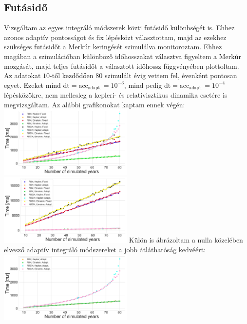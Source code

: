 \begin{multicols}{2}
\section{Futásidő} \label{sec:6}
Vizsgáltam az egyes integráló módszerek közti futásidő különbségét is. Ehhez azonos adaptív pontosságot és fix lépésközt választottam, majd az ezekhez szükséges futásidőt a Merkúr keringését szimulálva monitoroztam. Ehhez magában a szimulációban különböző időhosszakat választva figyeltem a Merkúr mozgását, majd teljes futásidőt a választott időhossz függvényében plottoltam. Az adatokat $10$-től kezdődően $80$ szimulált évig vettem fel, évenként pontosan egyet. Ezeket mind $\text{dt}=\text{acc}_{\text{adapt.}}=10^{-3}$, mind pedig $\text{dt}=\text{acc}_{\text{adapt.}}=10^{-4}$ lépésközökre, nem mellesleg a kepleri- és relativisztikus dinamika esetére is megvizsgáltam. Az alábbi grafikonokat kaptam ennek végén:
\hfill \break \break
{\centering\includegraphics[width=0.5\textwidth]{images/single_body/runtime_all_1e-03.pdf}}
\hfill \break \break
{\centering\includegraphics[width=0.5\textwidth]{images/single_body/runtime_all_1e-04.pdf}}
\hfill \break \break
Külön is ábrázoltam a nulla közelében elvesző adaptív integráló módszereket a jobb átláthatóság kedvéért:
\hfill \break \break
{\centering\includegraphics[width=0.5\textwidth]{images/single_body/runtime_adaptive_1e-03.pdf}}

\end{multicols}

